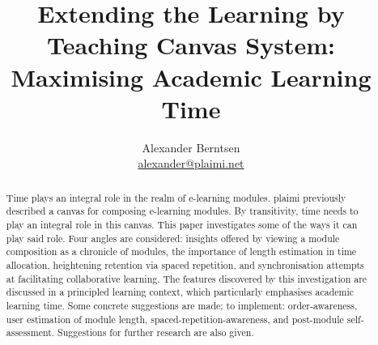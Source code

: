 \documentclass{article}
\title{\vspace{-15mm}\fontsize{16pt}{10pt}\selectfont
\textbf{Extending the Learning by Teaching Canvas System: Maximising Academic 
Learning Time}}
\author{\begin{tabular}{c c c}
    Alexander Berntsen \\
    \href{mailto:alexander@plaimi.net}{alexander@plaimi.net}
\end{tabular}
}
\begin{document}
\maketitle
\begin{abstract}
\noindent Time plays an integral role in the realm of e-learning modules. plaimi 
previously described a canvas for composing e-learning modules. By 
transitivity, time needs to play an integral role in this canvas. This paper 
investigates some of the ways it can play said role. Four angles are 
considered: insights offered by viewing a module composition as a chronicle of 
modules, the importance of length estimation in time allocation, heightening 
retention via spaced repetition, and synchronisation attempts at facilitating 
collaborative learning. The features discovered by this investigation are 
discussed in a principled learning context, which particularly emphasises 
academic learning time. Some concrete suggestions are made; to implement: 
order-awareness, user estimation of module length, 
spaced-repetition-awareness, and post-module self-assessment. Suggestions for 
further research are also given.
 \end{abstract}
\tableofcontents
\listoffigures
\newpage
\end{document}
